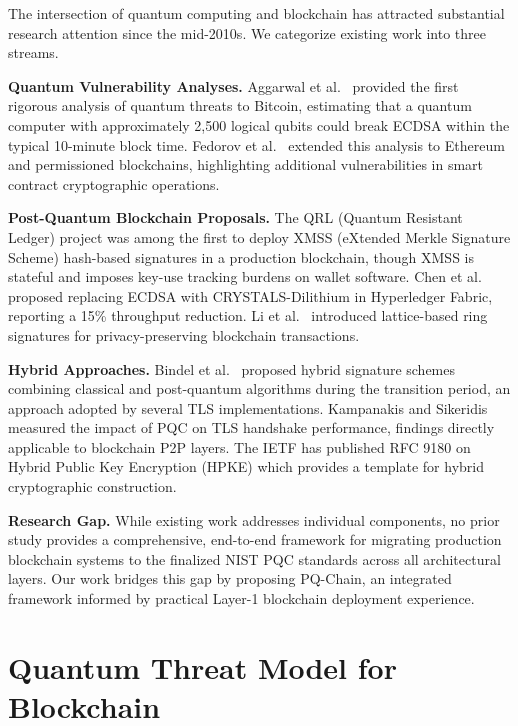 \documentclass[12pt, a4paper, twocolumn]{article}
\begin{document}
The intersection of quantum computing and blockchain has attracted substantial research attention since the mid-2010s. We categorize existing work into three streams.

\textbf{Quantum Vulnerability Analyses.}
Aggarwal et al.\ \cite{aggarwal2018quantum} provided the first rigorous analysis of quantum threats to Bitcoin, estimating that a quantum computer with approximately 2,500 logical qubits could break ECDSA within the typical 10-minute block time. Fedorov et al.\ \cite{fedorov2018quantum} extended this analysis to Ethereum and permissioned blockchains, highlighting additional vulnerabilities in smart contract cryptographic operations.

\textbf{Post-Quantum Blockchain Proposals.}
The QRL (Quantum Resistant Ledger) project \cite{qrl2018} was among the first to deploy XMSS (eXtended Merkle Signature Scheme) hash-based signatures in a production blockchain, though XMSS is stateful and imposes key-use tracking burdens on wallet software. Chen et al.\ \cite{chen2021postquantum} proposed replacing ECDSA with CRYSTALS-Dilithium in Hyperledger Fabric, reporting a 15\% throughput reduction. Li et al.\ \cite{li2021lattice} introduced lattice-based ring signatures for privacy-preserving blockchain transactions.

\textbf{Hybrid Approaches.}
Bindel et al.\ \cite{bindel2019hybrid} proposed hybrid signature schemes combining classical and post-quantum algorithms during the transition period, an approach adopted by several TLS implementations. Kampanakis and Sikeridis \cite{kampanakis2020pqtls} measured the impact of PQC on TLS handshake performance, findings directly applicable to blockchain P2P layers. The IETF has published RFC 9180 on Hybrid Public Key Encryption (HPKE) which provides a template for hybrid cryptographic construction.

\textbf{Research Gap.}
While existing work addresses individual components, no prior study provides a comprehensive, end-to-end framework for migrating production blockchain systems to the finalized NIST PQC standards across all architectural layers. Our work bridges this gap by proposing PQ-Chain, an integrated framework informed by practical Layer-1 blockchain deployment experience.

\section{Quantum Threat Model for Blockchain}
\label{sec:threat}
\end{document}

